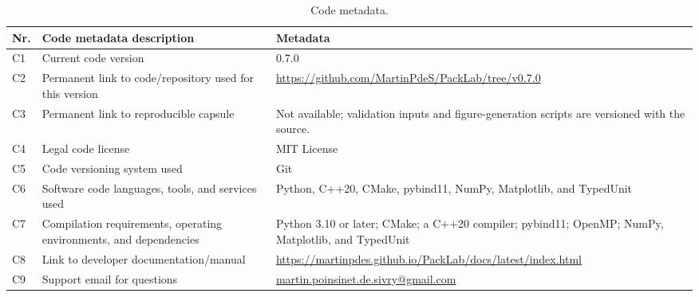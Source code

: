 \documentclass[preprint,12pt]{elsarticle}
\begin{document}
\begin{table}[t]
\centering
\footnotesize
\caption{Code metadata.}
\label{tab:code-metadata}
\begin{tabularx}{\textwidth}{@{}p{0.35in}p{2.25in}X@{}}
\toprule
Nr. & Code metadata description & Metadata \\
\midrule
C1 & Current code version & 0.7.0 \\
C2 & Permanent link to code/repository used for this version & \url{https://github.com/MartinPdeS/PackLab/tree/v0.7.0} \\
C3 & Permanent link to reproducible capsule & Not available; validation inputs and figure-generation scripts are versioned with the source. \\
C4 & Legal code license & MIT License \\
C5 & Code versioning system used & Git \\
C6 & Software code languages, tools, and services used & Python, C++20, CMake, pybind11, NumPy, Matplotlib, and TypedUnit \\
C7 & Compilation requirements, operating environments, and dependencies & Python 3.10 or later; CMake; a C++20 compiler; pybind11; OpenMP; NumPy, Matplotlib, and TypedUnit \\
C8 & Link to developer documentation/manual & \url{https://martinpdes.github.io/PackLab/docs/latest/index.html} \\
C9 & Support email for questions & \href{mailto:martin.poinsinet.de.sivry@gmail.com}{martin.poinsinet.de.sivry@gmail.com} \\
\bottomrule
\end{tabularx}
\end{table}
\end{document}
